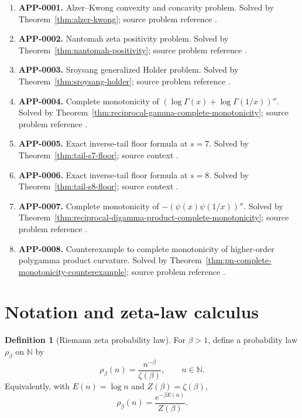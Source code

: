 \documentclass[11pt]{article}
\numberwithin{equation}{section}
\theoremstyle{definition}
\newtheorem{definition}[theorem]{Definition}
\theoremstyle{remark}
\newcommand{\N}{\mathbb N}
\newcommand{\1}{\mathbf 1}
\begin{document}
\begin{enumerate}
\item \textbf{APP-0001.} Alzer--Kwong convexity and concavity problem.  Solved by Theorem~\ref{thm:alzer-kwong}; source problem reference \cite{alzer-kwong}.
\item \textbf{APP-0002.} Nantomah zeta positivity problem.  Solved by Theorem~\ref{thm:nantomah-positivity}; source problem reference \cite{nantomah}.
\item \textbf{APP-0003.} Sroysang generalized Holder problem.  Solved by Theorem~\ref{thm:sroysang-holder}; source problem reference \cite{sroysang}.
\item \textbf{APP-0004.} Complete monotonicity of \((\log\Gamma(x)+\log\Gamma(1/x))''\).  Solved by Theorem~\ref{thm:reciprocal-gamma-complete-monotonicity}; source problem reference \cite{qi-lim-nantomah-polygamma}.
\item \textbf{APP-0005.} Exact inverse-tail floor formula at \(s=7\).  Solved by Theorem~\ref{thm:tail-s7-floor}; source context \cite{kim-song-tail,pan-wu-tail}.
\item \textbf{APP-0006.} Exact inverse-tail floor formula at \(s=8\).  Solved by Theorem~\ref{thm:tail-s8-floor}; source context \cite{kim-song-tail,pan-wu-tail}.
\item \textbf{APP-0007.} Complete monotonicity of \(-(\psi(x)\psi(1/x))''\).  Solved by Theorem~\ref{thm:reciprocal-digamma-product-complete-monotonicity}; source problem reference \cite{qi-lim-nantomah-polygamma}.
\item \textbf{APP-0008.} Counterexample to complete monotonicity of higher-order polygamma product curvature.  Solved by Theorem~\ref{thm:pn-complete-monotonicity-counterexample}; source problem reference \cite{qi-lim-nantomah-polygamma}.
\end{enumerate}

\section{Notation and zeta-law calculus}

\begin{definition}[Riemann zeta probability law]
\label{def:zeta-law}
For \(\beta>1\), define a probability law \(\rho_\beta\) on \(\N\) by
\begin{equation}
\label{eq:zeta-law}
\rho_\beta(n)=\frac{n^{-\beta}}{\zeta(\beta)},\qquad n\in\N.
\end{equation}
Equivalently, with \(E(n)=\log n\) and \(Z(\beta)=\zeta(\beta)\),
\begin{equation}
\label{eq:gibbs-form}
\rho_\beta(n)=\frac{e^{-\beta E(n)}}{Z(\beta)}.
\end{equation}
\end{definition}
\end{document}

